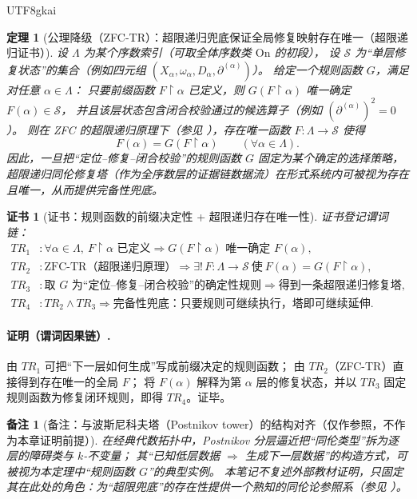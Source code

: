 \documentclass[12pt]{article}
\newtheorem{theorem}{定理}[section]
\newtheorem{remark}{备注}[section]
\newtheorem{Certificate}{证书}[section]
\begin{document}
\begin{CJK*}{UTF8}{gkai}
\begin{theorem}[公理降级（ZFC-TR）：超限递归兜底保证全局修复映射存在唯一（超限递归证书）]
\label{thm:tex29-ch15-transfinite-recursion}
设 $\Lambda$ 为某个序数索引（可取全体序数类 $\mathrm{On}$ 的初段），
设 $\mathcal{S}$ 为“单层修复状态”的集合（例如四元组 $(X_\alpha,\omega_\alpha,D_\alpha,\partial^{(\alpha)})$）。
给定一个规则函数 $G$，满足对任意 $\alpha\in\Lambda$：
只要前缀函数 $F\!\upharpoonright\!\alpha$ 已定义，则 $G(F\!\upharpoonright\!\alpha)$ 唯一确定 $F(\alpha)\in\mathcal{S}$，
并且该层状态包含闭合校验通过的候选算子（例如 $(\partial^{(\alpha)})^2=0$）。
则在 ZFC 的超限递归原理下（参见 \cite{Jech2003SetTheory,Kunen2011SetTheory}），存在唯一函数 $F:\Lambda\to\mathcal{S}$ 使得
\[
  F(\alpha)=G(F\!\upharpoonright\!\alpha)\qquad(\forall \alpha\in\Lambda).
\]
因此，一旦把“定位--修复--闭合校验”的规则函数 $G$ 固定为某个确定的选择策略，
超限递归同伦修复塔（作为全序数层的证据链数据流）在形式系统内可被视为\emph{存在且唯一}，从而提供完备性兜底。
\end{theorem}

\begin{Certificate}[证书：规则函数的前缀决定性 + 超限递归存在唯一性]
\label{cert:tex29-ch15-transfinite-recursion}
证书登记谓词链：
\[
\begin{aligned}
  TR_1 &: \forall \alpha\in\Lambda,\ \text{$F\!\upharpoonright\!\alpha$ 已定义}\Rightarrow
    \text{$G(F\!\upharpoonright\!\alpha)$ 唯一确定 $F(\alpha)$},\\
  TR_2 &: \text{ZFC-TR（超限递归原理）}\Rightarrow \exists!\,F:\Lambda\to\mathcal{S}\ \text{使}\ F(\alpha)
    =G(F\!\upharpoonright\!\alpha),\\
  TR_3 &: \text{取 $G$ 为“定位--修复--闭合校验”的确定性规则}\Rightarrow \text{得到一条超限递归修复塔},\\
  TR_4 &: TR_2\wedge TR_3\Rightarrow \text{完备性兜底：只要规则可继续执行，塔即可继续延伸}.
\end{aligned}
\]
\end{Certificate}

\paragraph{证明（谓词因果链）.}
由 $TR_1$ 可把“下一层如何生成”写成前缀决定的规则函数；
由 $TR_2$（ZFC-TR）直接得到存在唯一的全局 $F$；
将 $F(\alpha)$ 解释为第 $\alpha$ 层的修复状态，并以 $TR_3$ 固定规则函数为修复闭环规则，即得 $TR_4$。证毕。

\begin{remark}[备注：与波斯尼科夫塔（Postnikov tower）的结构对齐（仅作参照，不作为本章证明前提）]
在经典代数拓扑中，Postnikov 分层逼近把“同伦类型”拆为逐层的障碍类与 $k$-不变量；
其“已知低层数据 $\Rightarrow$ 生成下一层数据”的构造方式，可被视为本定理中“规则函数 $G$”的典型实例。
本笔记不复述外部教材证明，只固定其在此处的角色：为“超限兜底”的存在性提供一个熟知的同伦论参照系（参见 \cite{Whitehead1978Elements,May1999Concise,
  Switzer1975HomotopyHomology}）。
\end{remark}


\end{CJK*}
\end{document}
